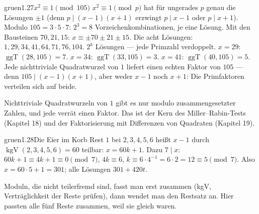 \begin{loesungkarte}{gruen}{1.27}{$x^{2}\equiv1\pmod{105}$}
$x^{2}\equiv1\pmod p$ hat für ungerades $p$ genau die Lösungen $\pm1$ (denn $p\mid(x - 1)(x + 1)$ erzwingt $p\mid x - 1$ oder $p\mid x + 1$). Modulo $105 = 3\cdot5\cdot7$: $2^{3} = 8$ Vorzeichenkombinationen, je eine Lösung. Mit den Bausteinen $70, 21, 15$: $x\equiv\pm70\pm21\pm15$. Die acht Lösungen: $1, 29, 34, 41, 64, 71, 76, 104$.
$2^{k}$ Lösungen --- jede Primzahl verdoppelt.
$x = 29$: $\operatorname{ggT}(28, 105) = 7$. $x = 34$: $\operatorname{ggT}(33, 105) = 3$. $x = 41$: $\operatorname{ggT}(40, 105) = 5$. Jede nichttriviale Quadratwurzel von $1$ liefert einen echten Faktor von $105$ --- denn $105\mid(x - 1)(x + 1)$, aber weder $x - 1$ noch $x + 1$: Die Primfaktoren verteilen sich auf beide.
\begin{mitnehmen}\kastentext
Nichttriviale Quadratwurzeln von $1$ gibt es nur modulo zusammengesetzter Zahlen, und jede verrät einen Faktor. Das ist der Kern des Miller--Rabin-Tests (Kapitel 18) und der Faktorisierung mit Differenzen von Quadraten (Kapitel 19).
\end{mitnehmen}
\end{loesungkarte}

\begin{loesungkarte}{gruen}{1.28}{Die Eier im Korb}
Rest $1$ bei $2, 3, 4, 5, 6$ heißt $x - 1$ durch $\operatorname{kgV}(2, 3, 4, 5, 6) = 60$ teilbar: $x = 60k + 1$. Dazu $7\mid x$: $60k + 1\equiv4k + 1\equiv0\pmod7$, $4k\equiv6$, $k\equiv6\cdot4^{-1} = 6\cdot2 = 12\equiv5\pmod7$. Also $x = 60\cdot5 + 1 = 301$; alle Lösungen $301 + 420t$.
\begin{mitnehmen}\kastentext
Moduln, die nicht teilerfremd sind, fasst man erst zusammen (kgV, Verträglichkeit der Reste prüfen), dann wendet man den Restsatz an. Hier passten alle fünf Reste zusammen, weil sie gleich waren.
\end{mitnehmen}
\end{loesungkarte}

